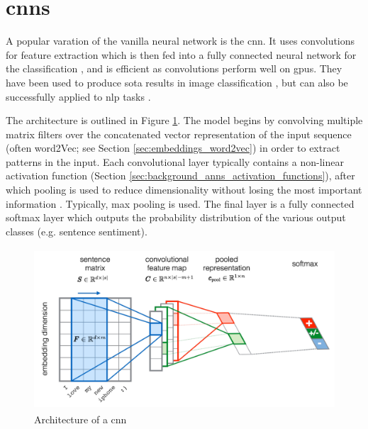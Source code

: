 \section{\acrlong{cnn}s}
\label{sec:background_cnns}

A popular varation of the vanilla neural network is the \acrfull{cnn}. It uses convolutions for feature extraction which is then fed into a fully connected neural network for the classification \citep{Budiharto}, and is efficient as convolutions perform well on \acrshort{gpu}s. They have been used to produce \acrfull{sota} results in image classification \citep{krizhevsky2017imagenet}, but can also be successfully applied to \acrshort{nlp} tasks \citep{kim2014convolutional}.

The architecture is outlined in Figure \ref{fig:cnn_architecture}. The model begins by convolving multiple matrix filters over the concatenated vector representation of the input sequence (often word2Vec; see Section \ref{sec:embeddings_word2vec}) in order to extract
patterns in the input. Each convolutional layer typically contains a non-linear activation function (Section \ref{sec:background_anns_activation_functions}), after which pooling is used to reduce dimensionality without losing the most important information \citep{Severyn2015UNITNTD}. Typically, max pooling is used. The final layer is a fully connected softmax layer which outputs the probability distribution of the various output classes (e.g. sentence sentiment).

\begin{figure}[h]
    \centering
    \includegraphics[height=6cm,trim={0 0 0cm 0cm},clip]{paper/images/cnn.png}
    \caption{Architecture of a \acrlong{cnn} \citep{Severyn2015UNITNTD}}
    \label{fig:cnn_architecture}
\end{figure}


